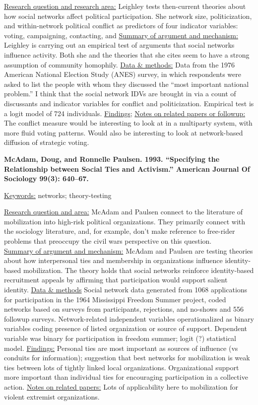 \documentclass{article}[12pt]
\begin{document}
\underline{Research question and research area:} Leighley tests then-current theories about how social networks affect political participation. She network size, politicization, and within-network political conflict as predictors of four indicator variables: voting, campaigning, contacting, and 
\underline{Summary of argument and mechanism:} Leighley is carrying out an empirical test of arguments that social networks influence activity. Both she and the theories that she cites seem to have a strong assumption of community homophily.
\underline{Data \& methods:} Data from the 1976 American National Election Study (ANES) survey, in which respondents were asked to list the people with whom they discussed the ``most important national problem.''  I think that the social network IDVs are brought in via a count of discussants and indicator variables for conflict and politicization. Empirical test is a logit model of 724 individuals.
\underline{Findings};
\underline{Notes on related papers or followup:} The conflict measure would be interesting to look at in a multiparty system, with more fluid voting patterns. Would also be interesting to look at network-based diffusion of strategic voting. 

\textbf{McAdam, Doug, and Ronnelle Paulsen. 1993. “Specifying the Relationship between Social Ties and Activism.” American Journal Of Sociology 99(3): 640–67.}

\underline{Keywords:} networks; theory-testing

\underline{Research question and area:} McAdam and Paulsen connect to the literature of mobilization into high-risk political organizations. They primarily connect with the sociology literature, and, for example, don't make reference to free-rider problems that preoccupy the civil wars perspective on this question.\\
\underline{Summary of argument and mechanism:} McAdam and Paulsen are testing theories about how interpersonal ties and membership in organizations influence identity-based mobilization. The theory holds that social networks reinforce identity-based recruitment appeals by affirming that participation would support salient identity.
\underline{Data \& methods} Social network data generated from 1068 applications for participation in the 1964 Mississippi Freedom Summer project, coded networks based on surveys from participants, rejections, and no-shows and 556 followup surveys. Network-related independent variables operationalized as binary variables coding presence of listed organization or source of support.  Dependent variable was binary for participation in freedom summer; logit (?) statistical model.
\underline{Findings:} Personal ties are most important as sources of influence (vs conduits for information); suggestion that best networks for mobilization is weak ties between lots of tightly linked local organizations. Organizational support more important than individual ties for encouraging participation in a collective action.
\underline{Notes on related papers:} Lots of applicability here to mobilization for violent extremist organizations. 
\end{document}

